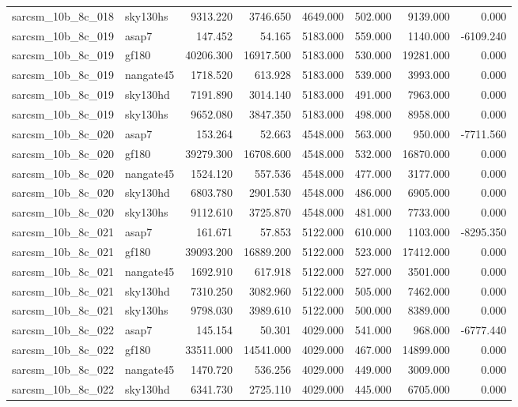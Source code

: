 \begin{tabular}{llrrrrrr}
sarcsm\_10b\_8c\_018 & sky130hs & 9313.220 & 3746.650 & 4649.000 & 502.000 & 9139.000 & 0.000 \\
sarcsm\_10b\_8c\_019 & asap7 & 147.452 & 54.165 & 5183.000 & 559.000 & 1140.000 & -6109.240 \\
sarcsm\_10b\_8c\_019 & gf180 & 40206.300 & 16917.500 & 5183.000 & 530.000 & 19281.000 & 0.000 \\
sarcsm\_10b\_8c\_019 & nangate45 & 1718.520 & 613.928 & 5183.000 & 539.000 & 3993.000 & 0.000 \\
sarcsm\_10b\_8c\_019 & sky130hd & 7191.890 & 3014.140 & 5183.000 & 491.000 & 7963.000 & 0.000 \\
sarcsm\_10b\_8c\_019 & sky130hs & 9652.080 & 3847.350 & 5183.000 & 498.000 & 8958.000 & 0.000 \\
sarcsm\_10b\_8c\_020 & asap7 & 153.264 & 52.663 & 4548.000 & 563.000 & 950.000 & -7711.560 \\
sarcsm\_10b\_8c\_020 & gf180 & 39279.300 & 16708.600 & 4548.000 & 532.000 & 16870.000 & 0.000 \\
sarcsm\_10b\_8c\_020 & nangate45 & 1524.120 & 557.536 & 4548.000 & 477.000 & 3177.000 & 0.000 \\
sarcsm\_10b\_8c\_020 & sky130hd & 6803.780 & 2901.530 & 4548.000 & 486.000 & 6905.000 & 0.000 \\
sarcsm\_10b\_8c\_020 & sky130hs & 9112.610 & 3725.870 & 4548.000 & 481.000 & 7733.000 & 0.000 \\
sarcsm\_10b\_8c\_021 & asap7 & 161.671 & 57.853 & 5122.000 & 610.000 & 1103.000 & -8295.350 \\
sarcsm\_10b\_8c\_021 & gf180 & 39093.200 & 16889.200 & 5122.000 & 523.000 & 17412.000 & 0.000 \\
sarcsm\_10b\_8c\_021 & nangate45 & 1692.910 & 617.918 & 5122.000 & 527.000 & 3501.000 & 0.000 \\
sarcsm\_10b\_8c\_021 & sky130hd & 7310.250 & 3082.960 & 5122.000 & 505.000 & 7462.000 & 0.000 \\
sarcsm\_10b\_8c\_021 & sky130hs & 9798.030 & 3989.610 & 5122.000 & 500.000 & 8389.000 & 0.000 \\
sarcsm\_10b\_8c\_022 & asap7 & 145.154 & 50.301 & 4029.000 & 541.000 & 968.000 & -6777.440 \\
sarcsm\_10b\_8c\_022 & gf180 & 33511.000 & 14541.000 & 4029.000 & 467.000 & 14899.000 & 0.000 \\
sarcsm\_10b\_8c\_022 & nangate45 & 1470.720 & 536.256 & 4029.000 & 449.000 & 3009.000 & 0.000 \\
sarcsm\_10b\_8c\_022 & sky130hd & 6341.730 & 2725.110 & 4029.000 & 445.000 & 6705.000 & 0.000 \\

\end{tabular}

